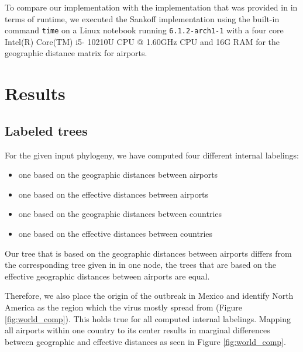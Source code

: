 \documentclass{article}
\begin{document}
To compare our implementation with the implementation that
was provided in \cite{reimeringPhylogeographicReconstructionUsing2020} in terms of runtime, we
executed the Sankoff implementation using the built-in command \texttt{time} on
a Linux notebook running \texttt{6.1.2-arch1-1} with a four core Intel(R) Core(TM) i5-
10210U CPU @ 1.60GHz CPU and 16G RAM for the geographic distance matrix for airports.

\section{Results}

\subsection{Labeled trees}
For the given input phylogeny, we have computed four different internal labelings: 
\begin{itemize}
    \item one based on the geographic distances between airports
    \item one based on the effective distances between airports
    \item one based on the geographic distances between countries
    \item one based on the effective distances between countries
\end{itemize}

Our tree that is based on the geographic distances between airports differs from the corresponding tree given in
\cite{reimeringPhylogeographicReconstructionUsing2020} in
one node, the trees that are based
on the effective geographic distances between airports are equal. 

Therefore, we also place the origin of the outbreak in Mexico and identify North America as the region which the virus mostly spread from (Figure \ref{fig:world_comp}). This holds true for all computed internal labelings. Mapping all airports within one country to its center results in marginal differences between geographic and effective distances as seen in Figure \ref{fig:world_comp}. 
\end{document}
